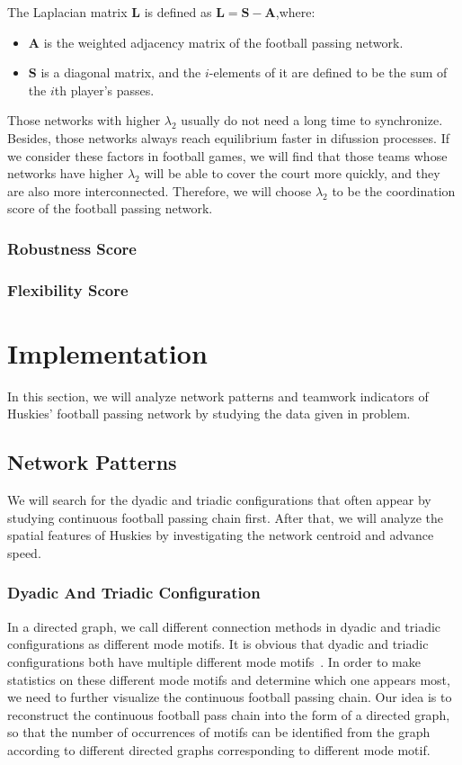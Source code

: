 \documentclass{mcmthesis}
\begin{document}
	The Laplacian matrix $\textbf{L}$ is defined as $\textbf{L}=\textbf{S}-\textbf{A}$,where:
	\begin{itemize}
	\item \textbf{A} is the weighted adjacency matrix of the football passing network.
	\item \textbf{S} is a diagonal matrix, and the $i$-elements of it are defined to be the sum of the $i$th player's passes.
	\end{itemize}
	Those networks with higher  $\lambda_{2}$ usually do not need a long time to synchronize. Besides, those networks always reach equilibrium faster in difussion processes.  If we consider these factors in football games, we will find that those teams whose networks have higher $\lambda_{2}$ will be able to cover the court more quickly, and they are also more interconnected.  Therefore, we will choose $\lambda_{2}$ to be the coordination score of the football passing network.
\subsubsection{Robustness Score}
\subsubsection{Flexibility Score}
\section{Implementation}
	In this section, we will analyze network patterns and teamwork indicators of Huskies' football passing network by studying the data given in problem. 
\subsection{Network Patterns}
	We will search for the dyadic and triadic configurations that often appear by studying continuous football passing chain first.  After that, we will analyze the spatial features of Huskies by investigating the network centroid and advance speed.
\subsubsection{Dyadic And Triadic Configuration}
	In a directed graph, we call different connection methods in dyadic and triadic configurations as different mode motifs.  It is obvious that dyadic and triadic configurations both have multiple different mode motifs~\cite{Second}.  In order to make statistics on these different mode motifs and determine which one appears most, we need to further visualize the continuous football passing chain.  Our idea is to reconstruct the continuous football pass chain into the form of a directed graph, so that the number of occurrences of motifs can be identified from the graph according to different directed graphs corresponding to different mode motif.
\end{document}

